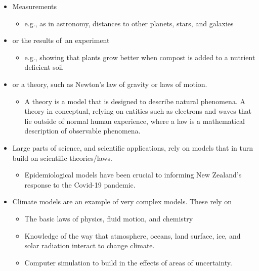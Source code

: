 \documentclass[
  10pt,
  b5paper]{book}
\providecommand{\tightlist}{%
  \setlength{\itemsep}{0pt}\setlength{\parskip}{0pt}}
\begin{document}
\begin{itemize}
\tightlist
\item
  Measurements

  \begin{itemize}
  \tightlist
  \item
    e.g., as in astronomy, distances to other planets,
    stars, and galaxies
  \end{itemize}
\item
  or the results of~an experiment

  \begin{itemize}
  \tightlist
  \item
    e.g., showing that plants grow better when compost is
    added to a nutrient deficient soil
  \end{itemize}
\item
  or a theory, such as Newton's law of gravity or laws of motion.

  \begin{itemize}
  \tightlist
  \item
    A theory is a model that is designed to describe natural
    phenomena. A theory in conceptual, relying on entities
    such as electrons and waves that lie outside of normal
    human experience, where a law is a mathematical description
    of observable phenomena.
  \end{itemize}
\item
  Large parts of science, and scientific applications, rely on
  models that in turn build on scientific theories/laws.

  \begin{itemize}
  \tightlist
  \item
    Epidemiological models have been crucial to informing
    New Zealand's response to the Covid-19 pandemic.
  \end{itemize}
\item
  Climate models are an example of very complex models. These
  rely on

  \begin{itemize}
  \tightlist
  \item
    The basic laws of physics, fluid motion, and chemistry
  \item
    Knowledge of the way that atmosphere, oceans, land
    surface, ice, and solar radiation interact to change
    climate.
  \item
    Computer simulation to build in the effects of areas
    of uncertainty.
  \end{itemize}
\end{itemize}
\end{document}
